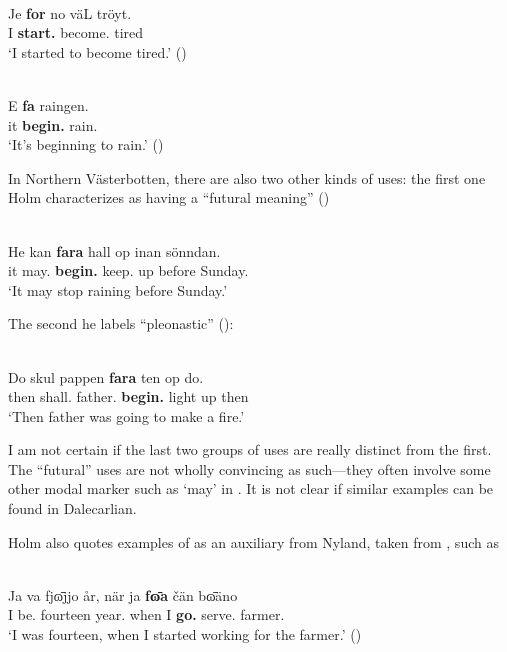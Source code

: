 \ea\label{}
\\
\gll Je  \textbf{for} no  väL  tröyt.\\
I  \textbf{start.{\pst}} {\prag}  become.{\inf}  tired\\
\glt ‘I started to become tired.’ (\citet[19]{Holm1942})
\z

\ea\label{}
\\
\gll E  \textbf{fa} raingen.\\
it  \textbf{begin.{\prs}} rain.{\inf}\\
\glt ‘It’s beginning to rain.’ (\citet[115]{Levander1909})
\z

In Northern Västerbotten, there are also two other kinds of uses: the first one Holm characterizes as having a “futural meaning” (\citet[20]{Holm1941})

\ea\label{}
\\
\gll He  kan  \textbf{fara} hall  op  inan  sönndan.\\
it  may.{\prs}  \textbf{begin.{\inf}} keep.{\inf}  up  before  Sunday.{}\\
\glt  ‘It may stop raining before Sunday.’
\z

The second he labels “pleonastic” (\citet[21]{Holm1941}):


\ea\label{}
\\
\gll Do  skul  pappen  \textbf{fara} ten  op  do.\\
then  shall.{\pst}  father.{}  \textbf{begin.{\inf}} light  up  then\\
\glt ‘Then father was going to make a fire.’
\z

I am not certain if the last two groups of uses are really distinct from the first. The “futural” uses are not wholly convincing as such—they often involve some other modal marker such as  ‘may’ in . It is not clear if similar examples can be found in Dalecarlian. 

Holm also quotes examples of  as an auxiliary from Nyland, taken from \citet{Lundström1939}, such as

\ea\label{}
\\
\gll Ja  va  fj\={ɷ}jjo   år,  när  ja  \textbf{f\={ɷ}a} čän  b\={ɷ}äno   \\
I  be.{\pst}  fourteen  year.{\pl}  when  I  \textbf{go.{\pst}} serve.{\inf}  farmer.{}  \\
\glt ‘I was fourteen, when I started working for the farmer.’ (\citet[133]{Lundström1939})
\z


